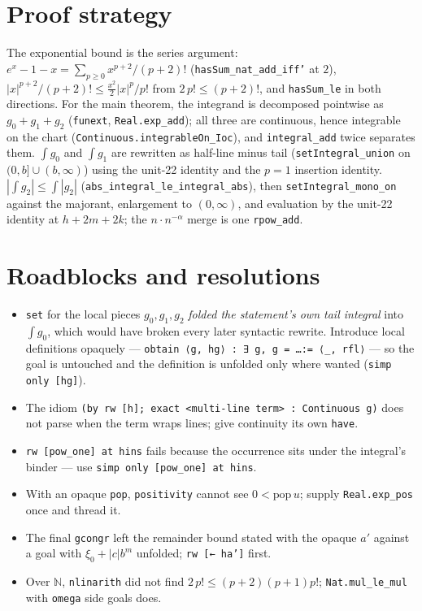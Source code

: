 \documentclass[11pt]{article}
\begin{document}
\section{Proof strategy}
The exponential bound is the series argument: $e^x-1-x=\sum_{p\ge0}x^{p+2}/(p+2)!$
(\texttt{hasSum\_nat\_add\_iff'} at $2$), $|x|^{p+2}/(p+2)!\le\tfrac{x^2}2|x|^p/p!$ from
$2\,p!\le(p+2)!$, and \texttt{hasSum\_le} in both directions. For the main theorem, the integrand is
decomposed pointwise as $g_0+g_1+g_2$ (\texttt{funext}, \texttt{Real.exp\_add}); all three are
continuous, hence integrable on the chart (\texttt{Continuous.integrableOn\_Ioc}), and
\texttt{integral\_add} twice separates them. $\int g_0$ and $\int g_1$ are rewritten as half-line minus
tail (\texttt{setIntegral\_union} on $(0,b]\cup(b,\infty)$) using the unit-22 identity and the
$p=1$ insertion identity. $|\int g_2|\le\int|g_2|$ (\texttt{abs\_integral\_le\_integral\_abs}), then
\texttt{setIntegral\_mono\_on} against the majorant, enlargement to $(0,\infty)$, and evaluation by the
unit-22 identity at $h+2m+2k$; the $n\cdot n^{-\alpha}$ merge is one \texttt{rpow\_add}.

\section{Roadblocks and resolutions}
\begin{itemize}
\item \texttt{set} for the local pieces $g_0,g_1,g_2$ \emph{folded the statement's own tail integral}
into $\int g_0$, which would have broken every later syntactic rewrite. Introduce local definitions
opaquely --- \texttt{obtain ⟨g, hg⟩ : ∃ g, g = \dots := ⟨\_, rfl⟩} --- so the goal is untouched and the
definition is unfolded only where wanted (\texttt{simp only [hg]}).
\item The idiom \texttt{(by rw [h]; exact <multi-line term> : Continuous g)} does not parse when the
term wraps lines; give continuity its own \texttt{have}.
\item \texttt{rw [pow\_one] at hins} fails because the occurrence sits under the integral's binder ---
use \texttt{simp only [pow\_one] at hins}.
\item With an opaque \texttt{pop}, \texttt{positivity} cannot see $0<\mathrm{pop}\,u$; supply
\texttt{Real.exp\_pos} once and thread it.
\item The final \texttt{gcongr} left the remainder bound stated with the opaque $a'$ against a goal
with $\xi_0+|c|b^m$ unfolded; \texttt{rw [← ha']} first.
\item Over $\mathbb N$, \texttt{nlinarith} did not find $2\,p!\le(p+2)(p+1)p!$; \texttt{Nat.mul\_le\_mul}
with \texttt{omega} side goals does.
\end{itemize}
\end{document}

